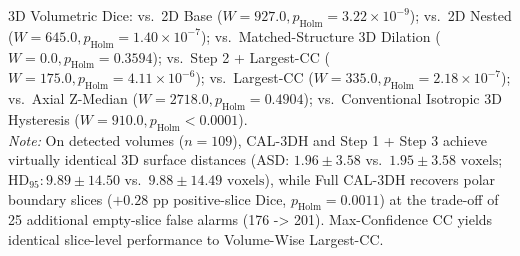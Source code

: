 \documentclass[11pt,a4paper]{article}
\begin{document}
\begin{table}[tbp]
\begin{minipage}{\textwidth}
3D Volumetric Dice: vs.\ 2D Base ($W=927.0, p_{\text{Holm}} = 3.22 \times 10^{-9}$); vs.\ 2D Nested ($W=645.0, p_{\text{Holm}} = 1.40 \times 10^{-7}$); vs.\ Matched-Structure 3D Dilation ($W=0.0, p_{\text{Holm}} = 0.3594$); vs.\ Step 2 + Largest-CC ($W=175.0, p_{\text{Holm}} = 4.11 \times 10^{-6}$); vs.\ Largest-CC ($W=335.0, p_{\text{Holm}} = 2.18 \times 10^{-7}$); vs.\ Axial Z-Median ($W=2718.0, p_{\text{Holm}} = 0.4904$); vs.\ Conventional Isotropic 3D Hysteresis ($W=910.0, p_{\text{Holm}} < 0.0001$).\\
\textit{Note:} On detected volumes ($n=109$), CAL-3DH and Step 1 + Step 3 achieve virtually identical 3D surface distances (ASD: $1.96 \pm 3.58$ vs.\ $1.95 \pm 3.58\text{ voxels}$; $\text{HD}_{95}: 9.89 \pm 14.50$ vs.\ $9.88 \pm 14.49\text{ voxels}$), while Full CAL-3DH recovers polar boundary slices ($+0.28\text{ pp}$ positive-slice Dice, $p_{\text{Holm}} = 0.0011$) at the trade-off of 25 additional empty-slice false alarms (176 -> 201). Max-Confidence CC yields identical slice-level performance to Volume-Wise Largest-CC.
\end{minipage}
\end{table}
\end{document}
